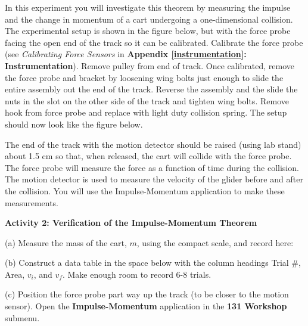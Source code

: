 In this experiment you will investigate this theorem by measuring the impulse
and the change in momentum of a cart undergoing a one-dimensional collision.
The experimental setup is shown in the figure below, but with the force probe 
facing the open end of the track so it can be calibrated.  Calibrate the force probe 
(see \textit{Calibrating Force Sensors} in \textbf{Appendix \ref{instrumentation}: Instrumentation}). 
Remove pulley from end of track. Once calibrated, remove the force probe and 
bracket by loosening wing bolts just enough to slide the entire assembly out the 
end of the track. Reverse the assembly and the slide the nuts in the slot on the 
other side of the track and tighten wing bolts. Remove hook from force probe and 
replace with light duty collision spring. The setup should now look like the figure 
below.

The end of the track with the motion detector should be raised (using lab stand) 
about 1.5 cm so that, when released, the cart will collide with the force probe. 
The force probe will measure the force as a function of time during the collision. 
The motion detector is used to measure the velocity of the glider before and after the 
collision. You will use the Impulse-Momentum application to make these measurements.

\vspace{0.3cm}
{\par\centering {} \par}
\vspace{0.3cm}

\textbf{Activity 2: Verification of the Impulse-Momentum Theorem} 

(a) Measure the mass of the cart, $m$, using the compact scale, and record here:
\vspace{10mm}

(b) Construct a data table in the space below with the column headings Trial
\#, Area, \( v_{i} \), and \( v_{f} \). Make enough room to record 6-8 trials.

\newpage

(c) Position the force probe part way up the track (to be closer to the motion sensor). Open the \textbf{Impulse-Momentum} application in the \textbf{131 Workshop} submenu. 

